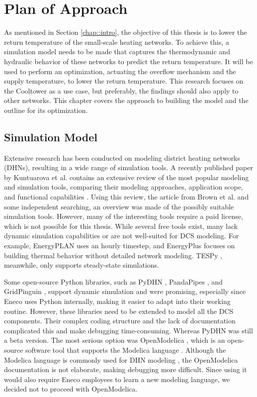 \chapter{Plan of Approach}\label{chap::PoA}
As mentioned in Section \ref{chap::intro}, the objective of this thesis is to lower the return temperature of the small-scale heating networks. To achieve this, a simulation model needs to be made that captures the thermodynamic and hydraulic behavior of these networks to predict the return temperature. It will be used to perform an optimization, actuating the overflow mechanism and the supply temperature, to lower the return temperature. This research focuses on the Cooltower as a use case, but preferably, the findings should also apply to other networks. This chapter covers the approach to building the model and the outline for its optimization.

\section{Simulation Model}
Extensive research has been conducted on modeling district heating networks (DHNs), resulting in a wide range of simulation tools. A recently published paper by Kuntuarova et al. contains an extensive review of the most popular modeling and simulation tools, comparing their modeling approaches, application scope, and functional capabilities \cite{KUNTUAROVA}. Using this review, the article from Brown et al. \cite{BROWN2022125060} and some independent searching, an overview was made of the possibly suitable simulation tools. However, many of the interesting tools require a paid license, which is not possible for this thesis. While several free tools exist, many lack dynamic simulation capabilities or are not well-suited for DCS modeling. For example, EnergyPLAN \cite{EnergyPlan} uses an hourly timestep, and EnergyPlus \cite{EnergyPlus} focuses on building thermal behavior without detailed network modeling. TESPy \cite{TESPy}, meanwhile, only supports steady-state simulations.

Some open-source Python libraries, such as PyDHN \cite{PyDHN}, PandaPipes \cite{pandapipes}, and GridPinguin \cite{GridPenguin}, support dynamic simulation and were promising, especially since Eneco uses Python internally, making it easier to adapt into their working routine. However, these libraries need to be extended to model all the DCS components. Their complex coding structure and the lack of documentation complicated this and make debugging time-consuming. Whereas PyDHN was still a beta version. The most serious option was OpenModelica \cite{OpenModelica}, which is an open-source software tool that supports the Modelica language \cite{Modelica}. Although the Modelica language is commonly used for DHN modeling \cite{KUNTUAROVA}, the OpenModelica documentation is not elaborate, making debugging more difficult. Since using it would also require Eneco employees to learn a new modeling language, we decided not to proceed with OpenModelica.  

